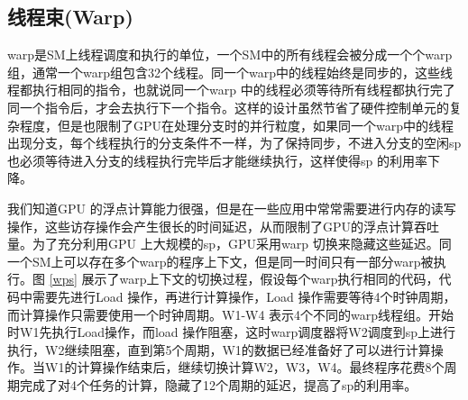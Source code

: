 \subsection{线程束(Warp)}
warp是SM上线程调度和执行的单位，一个SM中的所有线程会被分成一个个warp组，通常一个warp组包含32个线程。同一个warp中的线程始终是同步的，这些线程都执行相同的指令，也就说同一个warp 中的线程必须等待所有线程都执行完了同一个指令后，才会去执行下一个指令。这样的设计虽然节省了硬件控制单元的复杂程度，但是也限制了GPU在处理分支时的并行粒度，如果同一个warp中的线程出现分支，每个线程执行的分支条件不一样，为了保持同步，不进入分支的空闲sp也必须等待进入分支的线程执行完毕后才能继续执行，这样使得sp 的利用率下降。

我们知道GPU 的浮点计算能力很强，但是在一些应用中常常需要进行内存的读写操作，这些访存操作会产生很长的时间延迟，从而限制了GPU的浮点计算吞吐量。为了充分利用GPU 上大规模的sp，GPU采用warp 切换来隐藏这些延迟。同一个SM上可以存在多个warp的程序上下文，但是同一时间只有一部分warp被执行。图 \ref{wps} 展示了warp上下文的切换过程，假设每个warp执行相同的代码，代码中需要先进行Load 操作，再进行计算操作，Load 操作需要等待4个时钟周期，而计算操作只需要使用一个时钟周期。W1-W4 表示4个不同的warp线程组。开始时W1先执行Load操作，而load 操作阻塞，这时warp调度器将W2调度到sp上进行执行，W2继续阻塞，直到第5个周期，W1的数据已经准备好了可以进行计算操作。当W1的计算操作结束后，继续切换计算W2，W3，W4。最终程序花费8个周期完成了对4个任务的计算，隐藏了12个周期的延迟，提高了sp的利用率。

